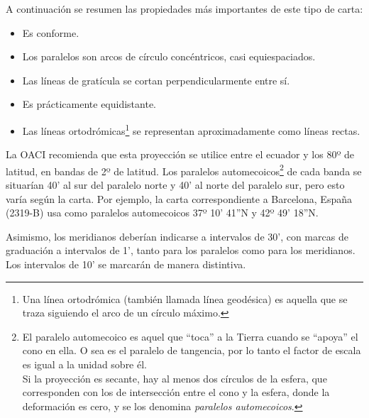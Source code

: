 \documentclass[a4paper,12pt,twoside]{article}
\begin{document}
A continuaci\'on se resumen las propiedades m\'as importantes de este tipo de carta:
\begin{itemize}

\item Es conforme.

  \item Los paralelos son arcos de c\'irculo conc\'entricos, casi
  equiespaciados.

  \item Las l\'ineas de grat\'icula se cortan perpendicularmente entre s\'i.

  \item Es pr\'acticamente equidistante.

  \item Las l\'ineas ortodr\'omicas\footnote{Una l\'inea ortodr\'omica (tambi\'en llamada l\'inea geod\'esica) es aquella que se traza siguiendo el arco de un c\'irculo m\'aximo.} se representan aproximadamente como l\'ineas
  rectas.
\end{itemize}
La OACI recomienda que esta proyecci\'on se utilice entre el ecuador y los 80º de latitud, en bandas de 2º de latitud. Los paralelos automecoicos\footnote{El paralelo automecoico es aquel que ``toca'' a la Tierra cuando se ``apoya'' el cono en ella. O sea es el paralelo de tangencia, por lo tanto el factor de escala es igual a la unidad sobre \'el.\\ Si la proyecci\'on es secante, hay al menos dos c\'irculos de la esfera, que corresponden con los de intersecci\'on entre el cono y la esfera, donde la deformaci\'on es cero, y se los denomina \emph{paralelos automecoicos}. } de cada banda se situar\'ian 40' al sur del paralelo norte y 40' al norte del paralelo sur, pero esto var\'ia seg\'un la carta. Por ejemplo, la carta correspondiente a Barcelona, Espa\~na (2319-B) usa como paralelos automecoicos 37º 10' 41''N y 42º 49' 18''N.


Asimismo, los meridianos deber\'ian indicarse a intervalos de 30', con marcas de graduaci\'on a intervalos de 1', tanto para los paralelos como para los meridianos. Los intervalos de 10' se marcar\'an de manera distintiva.
\end{document}
